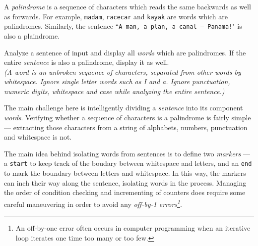 

\problem A {\em palindrome} is a sequence of characters which reads the same backwards as well as forwards.
For example, {\tt madam}, {\tt racecar} and {\tt kayak} are words which are palindromes. Similarly, the sentence ``{\tt A man, a plan, a canal -- Panama!}" is also a plaindrome.

Analyze a sentence of input and display all {\em words} which are palindromes. If the entire {\em sentence} is also a palindrome, display it as well.\\

{\em (A word is an unbroken sequence of characters, separated from other words by whitespace. Ignore single letter words such as {\em I} and {\em a}.
Ignore punctuation, numeric digits, whitespace and case while analyzing the entire sentence.)}

\solution The main challenge here is intelligently dividing a {\em sentence} into its component {\em words}. Verifying whether a sequence of characters is a palindrome is fairly simple --- extracting those characters from a string of alphabets, numbers, punctuation and whitespace is not.

The main idea behind isolating words from sentences is to define two {\em markers} --- a {\tt start} to keep track of the boudary between whitespace and letters, and an {\tt end} to mark the boundary between letters and whitespace. In this way, the markers can inch their way along the sentence, isolating words in the process. Managing the order of condition checking and incrementing of counters does require some careful maneuvering in order to avoid any {\em off-by-1 errors\footnote{An off-by-one error often occurs in computer programming when an iterative loop iterates one time too many or too few.}}.

